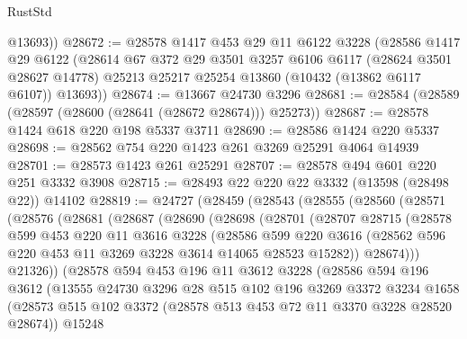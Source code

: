 \begin{lexlean}{RustStd}
\begin{coremodule}
        @13693))
@28672 := @28578
    @1417
    @453
    @29
    @11
    @6122
    @3228
    (@28586
      @1417
      @29
      @6122
      (@28614
        @67
        @372
        @29
        @3501
        @3257
        @6106
        @6117
        (@28624 @3501 @28627 @14778)
        @25213
        @25217
        @25254
        @13860
        (@10432 (@13862 @6117 @6107))
        @13693))
@28674 := @13667 @24730 @3296
@28681 := @28584 (@28589 (@28597 (@28600 (@28641 (@28672 @28674))) @25273))
@28687 := @28578 @1424 @618 @220 @198 @5337 @3711
@28690 := @28586 @1424 @220 @5337
@28698 := @28562 @754 @220 @1423 @261 @3269 @25291 @4064 @14939
@28701 := @28573 @1423 @261 @25291
@28707 := @28578 @494 @601 @220 @251 @3332 @3908
@28715 := @28493 @22 @220 @22 @3332 (@13598 (@28498 @22)) @14102
@28819 := @24727
    (@28459
      (@28543
        (@28555
          (@28560
            (@28571
              (@28576
                (@28681
                  (@28687
                    (@28690
                      (@28698
                        (@28701
                          (@28707
                            @28715
                            (@28578
                              @599
                              @453
                              @220
                              @11
                              @3616
                              @3228
                              (@28586
                                @599
                                @220
                                @3616
                                (@28562 @596 @220 @453 @11 @3269 @3228 @3614 @14065 @28523 @15282))
                              @28674)))
                        @21326))
                    (@28578
                      @594
                      @453
                      @196
                      @11
                      @3612
                      @3228
                      (@28586
                        @594
                        @196
                        @3612
                        (@13555
                          @24730
                          @3296
                          @28
                          @515
                          @102
                          @196
                          @3269
                          @3372
                          @3234
                          @1658
                          (@28573
                            @515
                            @102
                            @3372
                            (@28578 @513 @453 @72 @11 @3370 @3228 @28520 @28674))
                          @15248

\end{coremodule}
\end{lexlean}
